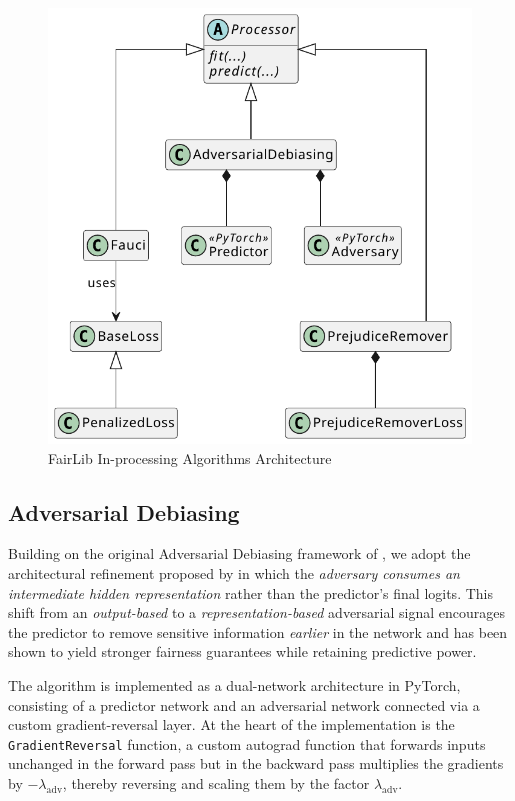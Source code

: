 \documentclass[12pt,a4paper,openright,twoside]{book}
\begin{document}
\begin{figure}
    \centering
    \includegraphics[width=\textwidth]{figures/uml/inprocessing.pdf}
    \caption{FairLib In-processing Algorithms Architecture}
    \label{fig:inprocessing-uml}
\end{figure}

\subsection{Adversarial Debiasing}
Building on the original Adversarial Debiasing framework of \cite{zhang2018mitigatingunwantedbiasesadversarial}, we adopt the architectural refinement proposed by \cite{beutel2017datadecisionstheoreticalimplications} in which the \emph{adversary consumes an intermediate hidden representation} rather than the predictor’s final logits.  This shift from an \textit{output-based} to a \textit{representation-based} adversarial signal encourages the predictor to remove sensitive information \emph{earlier} in the network and has been shown to yield stronger fairness guarantees while retaining predictive power.

The algorithm is implemented as a dual-network architecture in PyTorch, consisting of a predictor network and an adversarial network connected via a custom gradient-reversal layer.  At the heart of the implementation is the \texttt{GradientReversal} function, a custom autograd function that forwards inputs unchanged in the forward pass but in the backward pass multiplies the gradients by $-\lambda_{\text{adv}}$, thereby reversing and scaling them by the factor $\lambda_{\text{adv}}$.  
\end{document}
